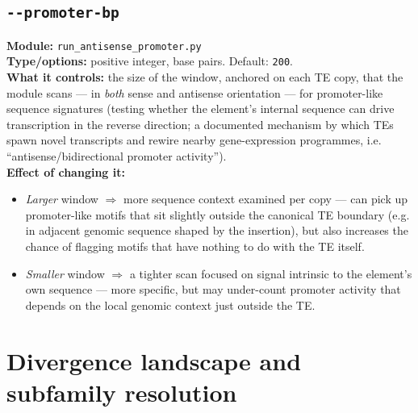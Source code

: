 \documentclass[11pt]{article}
\newcommand{\param}[1]{\subsection*{\texttt{-\/-#1}}}
\begin{document}
\param{promoter-bp}
\textbf{Module:} \texttt{run\_antisense\_promoter.py}\\
\textbf{Type/options:} positive integer, base pairs. Default: \texttt{200}.\\
\textbf{What it controls:} the size of the window, anchored on each TE copy, that the
module scans — in \emph{both} sense and antisense orientation — for promoter-like
sequence signatures (testing whether the element's internal sequence can drive
transcription in the reverse direction; a documented mechanism by which TEs spawn novel
transcripts and rewire nearby gene-expression programmes, i.e. ``antisense/bidirectional
promoter activity'').\\
\textbf{Effect of changing it:}
\begin{itemize}[leftmargin=1.4em,topsep=2pt,itemsep=2pt]
  \item \emph{Larger} window $\Rightarrow$ more sequence context examined per copy —
    can pick up promoter-like motifs that sit slightly outside the canonical TE
    boundary (e.g. in adjacent genomic sequence shaped by the insertion), but also
    increases the chance of flagging motifs that have nothing to do with the TE itself.
  \item \emph{Smaller} window $\Rightarrow$ a tighter scan focused on signal intrinsic
    to the element's own sequence — more specific, but may under-count
    promoter activity that depends on the local genomic context just outside the TE.
\end{itemize}

\section{Divergence landscape and subfamily resolution}
\end{document}
